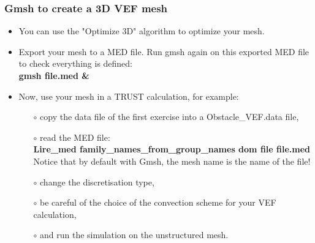 \documentclass[10pt, hyperref={unicode=true,pdfusetitle, bookmarks=true,bookmarksnumbered=false,bookmarksopen=false, breaklinks=false,pdfborder={0 0 1},backref=true,colorlinks=true,linkcolor=darkblue,pageanchor}]{beamer}
\begin{document}
\begin{frame}
\frametitle{Gmsh to create a 3D VEF mesh}
\begin{block}{}

\begin{itemize}
\item You can use the "Optimize 3D" algorithm to optimize your mesh.

\item Export your mesh to a MED file. Run gmsh again on this exported MED file to check everything is defined:\\
\textbf{gmsh file.med \&}

\item Now, use your mesh in a TRUST calculation, for example:
        \begin{itemize}
        \item [$\circ$] copy the data file of the first exercise into a Obstacle\_VEF.data file, \\
        \item [$\circ$] read the MED file:\\
                        \textbf{Lire\_med family\_names\_from\_group\_names dom file file.med } \\
                        Notice that by default with Gmsh, the mesh name is the name of the file!
        \item [$\circ$] change the discretisation type,
        \item [$\circ$] be careful of the choice of the convection scheme for your VEF calculation,
        \item [$\circ$] and run the simulation on the unstructured mesh.
        \end{itemize}
\end{itemize}

\end{block}
\end{frame}
\end{document}

